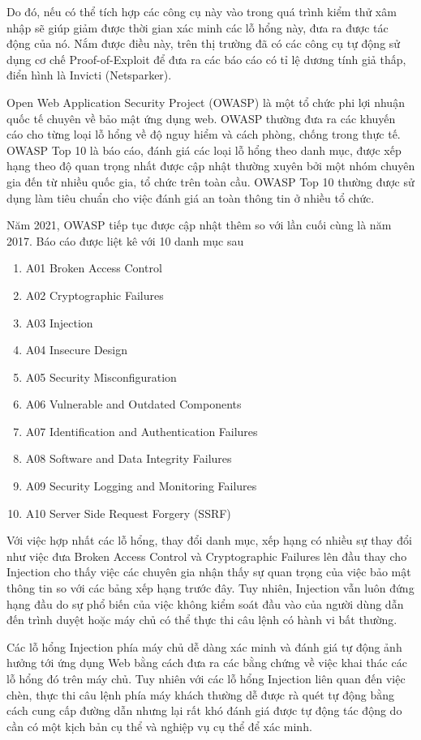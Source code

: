 \documentclass[./../main.tex]{subfiles}
\begin{document}
Do đó, nếu có thể tích hợp các công cụ này vào trong quá trình kiểm thử xâm nhập
sẽ giúp giảm được thời gian xác minh các lỗ hổng này, đưa ra được tác động của nó.
Nắm được điều này, trên thị trường đã có các công cụ tự động sử dụng cơ
chế Proof-of-Exploit để đưa ra các báo cáo có tỉ lệ dương tính giả thấp, điển hình
là Invicti (Netsparker).

Open Web Application Security Project (OWASP) là một tổ chức phi lợi nhuận quốc tế
chuyên về bảo mật ứng dụng web. OWASP thường đưa ra các khuyến cáo cho từng loại
lỗ hổng về độ nguy hiểm và cách phòng, chống trong thực tế. OWASP Top 10 là báo
cáo, đánh giá các loại lỗ hổng theo danh mục, được xếp hạng theo độ quan trọng
nhất được cập nhật thường xuyên bởi một nhóm chuyên gia đến từ nhiều quốc gia,
tổ chức trên toàn cầu. OWASP Top 10 thường được sử dụng làm tiêu chuẩn cho việc
đánh giá an toàn thông tin ở nhiều tổ chức.

Năm 2021, OWASP tiếp tục được cập nhật thêm so với lần cuối cùng là năm 2017. Báo cáo được liệt kê với 10 danh mục sau
\begin{enumerate}
	\item A01 Broken Access Control
	\item A02 Cryptographic Failures
	\item A03 Injection
	\item A04 Insecure Design
	\item A05 Security Misconfiguration
	\item A06 Vulnerable and Outdated Components
	\item A07 Identification and Authentication Failures
	\item A08 Software and Data Integrity Failures
	\item A09 Security Logging and Monitoring Failures
	\item A10 Server Side Request Forgery (SSRF)
\end{enumerate}
Với việc hợp nhất các lỗ hổng, thay đổi danh mục, xếp hạng có nhiều sự thay đổi như
việc đưa Broken Access Control và Cryptographic Failures lên đầu thay cho Injection
cho thấy việc các chuyên gia nhận thấy sự quan trọng của việc bảo mật thông tin so
với các bảng xếp hạng trước đây. Tuy nhiên, Injection vẫn luôn đứng hạng đầu do sự
phổ biến của việc không kiểm soát đầu vào của người dùng dẫn đến trình duyệt hoặc
máy chủ có thể thực thi câu lệnh có hành vi bất thường.

Các lỗ hổng Injection phía máy chủ dễ dàng xác minh và đánh giá tự động ảnh hưởng
tới ứng dụng Web bằng cách đưa ra các bằng chứng về việc khai thác các lỗ hổng đó
trên máy chủ. Tuy nhiên với các lỗ hổng Injection liên quan đến việc chèn, thực thi
câu lệnh phía máy khách thường dễ được rà quét tự động bằng cách cung cấp đường
dẫn nhưng lại rất khó đánh giá được tự động tác động do cần có một kịch bản cụ thể
và nghiệp vụ cụ thể để xác minh.
\end{document}
